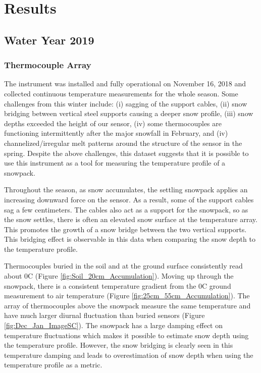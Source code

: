 \chapter{Results}
\section{Water Year 2019} 
\subsection{Thermocouple Array}
The instrument was installed and fully operational on November 16, 2018 and collected continuous temperature measurements for the whole season. Some challenges from this winter include: (i) sagging of the support cables, (ii) snow bridging between vertical steel supports causing a deeper snow profile, (iii) snow depths exceeded the height of our sensor, (iv) some thermocouples are functioning intermittently after the major snowfall in February, and (iv) channelized/irregular melt patterns around the structure of the sensor in the spring. Despite the above challenges, this dataset suggests that it is possible to use this instrument as a tool for measuring the temperature profile of a snowpack. 

Throughout the season, as snow accumulates, the settling snowpack applies an increasing downward force on the sensor. As a result, some of the support cables sag a few centimeters. The cables also act as a support for the snowpack, so as the snow settles, there is often an elevated snow surface at the temperature array. This promotes the growth of a snow bridge between the two vertical supports. This bridging effect is observable in this data when comparing the snow depth to the temperature profile.   

Thermocouples buried in the soil and at the ground surface consistently read about 0\textdegree C (Figure \ref{fig:Soil_20cm_Accumulation}). Moving up through the snowpack, there is a consistent temperature gradient from the 0\textdegree C ground measurement to air temperature (Figure \ref{fig:25cm_55cm_Accumulation}). The array of thermocouples above the snowpack measure the same temperature and have much larger diurnal fluctuation than buried sensors (Figure \ref{fig:Dec_Jan_ImageSC}). The snowpack has a large damping effect on temperature fluctuations which makes it possible to estimate snow depth using the temperature profile. However, the snow bridging is clearly seen in this temperature damping and leads to overestimation of snow depth when using the temperature profile as a metric. 

